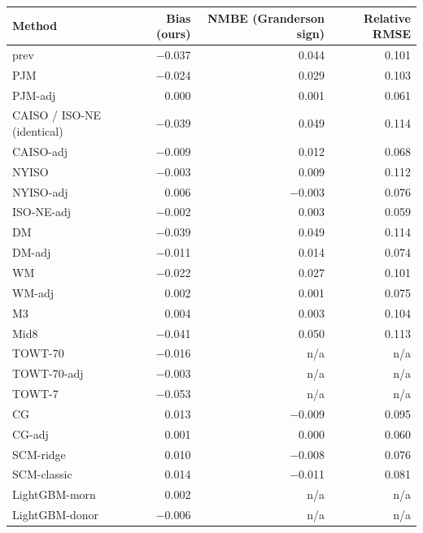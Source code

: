 \begin{tabular}{lrrr}
\toprule
Method & Bias (ours) & NMBE (Granderson sign) & Relative RMSE \\
\midrule
prev & $-$0.037 & 0.044 & 0.101 \\
PJM & $-$0.024 & 0.029 & 0.103 \\
PJM-adj & 0.000 & 0.001 & 0.061 \\
CAISO / ISO-NE (identical) & $-$0.039 & 0.049 & 0.114 \\
CAISO-adj & $-$0.009 & 0.012 & 0.068 \\
NYISO & $-$0.003 & 0.009 & 0.112 \\
NYISO-adj & 0.006 & $-$0.003 & 0.076 \\
ISO-NE-adj & $-$0.002 & 0.003 & 0.059 \\
DM & $-$0.039 & 0.049 & 0.114 \\
DM-adj & $-$0.011 & 0.014 & 0.074 \\
WM & $-$0.022 & 0.027 & 0.101 \\
WM-adj & 0.002 & 0.001 & 0.075 \\
M3 & 0.004 & 0.003 & 0.104 \\
Mid8 & $-$0.041 & 0.050 & 0.113 \\
TOWT-70 & $-$0.016 & n/a & n/a \\
TOWT-70-adj & $-$0.003 & n/a & n/a \\
TOWT-7 & $-$0.053 & n/a & n/a \\
CG & 0.013 & $-$0.009 & 0.095 \\
CG-adj & 0.001 & 0.000 & 0.060 \\
SCM-ridge & 0.010 & $-$0.008 & 0.076 \\
SCM-classic & 0.014 & $-$0.011 & 0.081 \\
LightGBM-morn & 0.002 & n/a & n/a \\
LightGBM-donor & $-$0.006 & n/a & n/a \\
\bottomrule
\end{tabular}
\par{}
